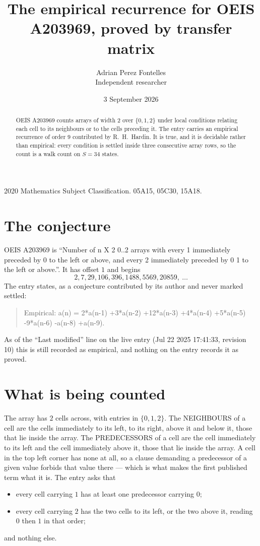 \documentclass[11pt,a4paper]{article}
\title{The empirical recurrence for OEIS A203969, proved by transfer matrix}
\author{Adrian Perez Fontelles\\ \small Independent researcher}
\date{3 September 2026}
\theoremstyle{plain}
\theoremstyle{definition}
\begin{document}
\maketitle

\begin{abstract}
OEIS A203969 counts arrays of width $2$ over $\{0,1,2\}$ under local conditions relating each cell
to its neighbours or to the cells preceding it. The entry carries an empirical recurrence of
order $9$ contributed by R.~H.~Hardin. It is true, and it is decidable rather than
empirical: every condition is settled inside three consecutive array rows, so the count is a
walk count on $S=34$ states.
\end{abstract}

\noindent\small 2020 Mathematics Subject Classification. 05A15, 05C30, 15A18.\normalsize

\section{The conjecture}

OEIS A203969 is ``Number of n X 2 0..2 arrays with every 1 immediately preceded by 0 to the left or above, and every 2 immediately preceded by 0 1 to the left or above.''. It has offset $1$ and begins
\[
2, 7, 29, 106, 396, 1488, 5569, 20859,\ \dots
\]
The entry states, as a conjecture contributed by its author and never marked settled:
\begin{quote}
Empirical: a(n) = 2*a(n-1) +3*a(n-2) +12*a(n-3) +4*a(n-4) +5*a(n-5) -9*a(n-6) -a(n-8) +a(n-9).
\end{quote}
As of the ``Last modified'' line on the live entry (Jul 22 2025 17:41:33, revision 10) this is still
recorded as empirical, and nothing on the entry records it as proved.

\section{What is being counted}

The array has $2$ cells across, with entries in $\{0,1,2\}$. The NEIGHBOURS of a cell are the
cells immediately to its left, to its right, above it and below it, those that lie inside the
array. The PREDECESSORS of a cell are the cell immediately to its left and the cell
immediately above it, those that lie inside the array. A cell in the top left corner has none
at all, so a clause demanding a predecessor of a given value forbids that value there --- which
is what makes the first published term what it is. The entry asks that
\begin{itemize}
\item every cell carrying $1$ has at least one predecessor carrying $0$;
\item every cell carrying $2$ has the two cells to its left, or the two above it, reading $0$ then $1$ in that order;
\end{itemize}
and nothing else.
\end{document}
